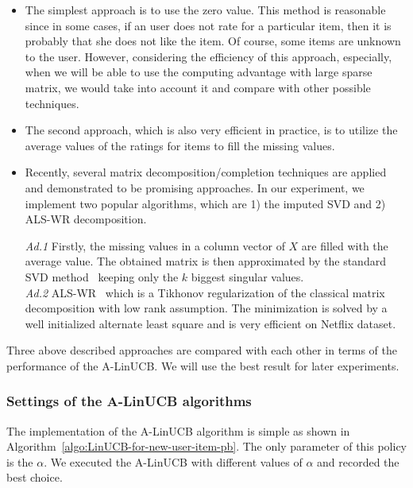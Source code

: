 \documentclass[twoside,leqno,twocolumn]{article}
\newcommand{\hai}[1]{\color{blue}(hai) #1\color{black}}
\begin{document}
\begin{itemize}
\item The simplest approach is to use the zero value. This method is reasonable since in some cases, if an user does not rate for a particular item, then it is probably that she does not like the item. Of course, some items are unknown to the user. However, considering the efficiency of this approach, especially, when we will be able to use the computing advantage with large sparse matrix, we would take into account it and compare with other possible techniques.

\item The second approach, which is also very efficient in practice, is to utilize the average values of the ratings for items to fill the missing values. 

\item Recently, several matrix decomposition/completion techniques are applied and demonstrated to be promising approaches. In our experiment, we implement two popular algorithms, which are 1) the imputed SVD and 2) ALS-WR decomposition.

\textit{Ad.1} Firstly, the missing values in a column vector of $X$ are filled with the average value. The obtained matrix is then approximated by the standard SVD method~\cite{Billsus:1998:LCI:645527.657311} keeping only the $k$ biggest singular values. \\

\textit{Ad.2} ALS-WR~\cite{Zhou:2008:LPC:1424237.1424269} which is a Tikhonov regularization of the classical matrix decomposition with low rank assumption. The minimization is solved by a well initialized alternate least square and is very efficient on Netflix dataset. 

\end{itemize}

Three above described approaches are compared with each other in terms of the performance of the A-LinUCB. We will use the best result for later experiments.

\subsubsection{Settings of the A-LinUCB algorithms}
The implementation of the A-LinUCB algorithm is simple as shown in Algorithm~\ref{algo:LinUCB-for-new-user-item-pb}. The only parameter of this policy is the $\alpha$. We executed the A-LinUCB with different values of $\alpha$ and recorded the best choice. 
\end{document}

